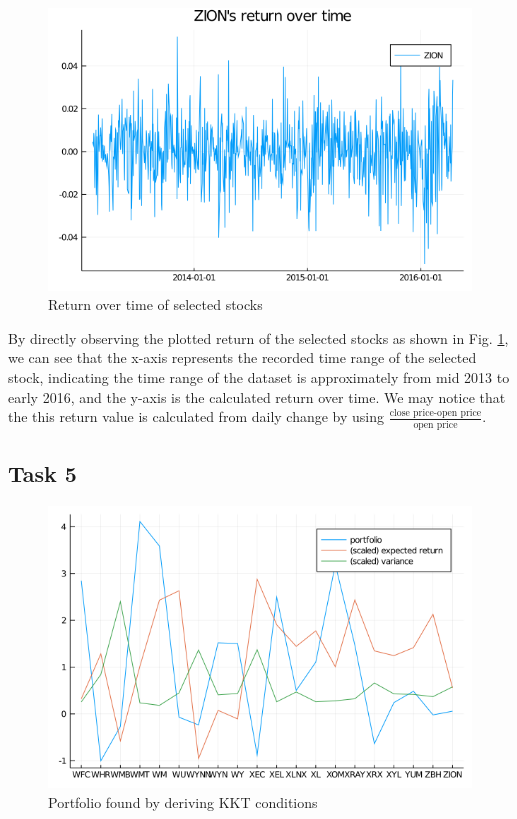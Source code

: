 \documentclass[12pt]{ftec2101}
\begin{document}
\begin{figure}[h]
\begin{minipage}{0.45\textwidth}
    \end{minipage}\hfill
    \begin{minipage}{0.45\textwidth}
        \centering
        \includegraphics[scale=0.3]{stock4.png}
    \end{minipage}
    \caption{Return over time of selected stocks}
    \label{fig:stock}
\end{figure}

By directly observing the plotted return of the selected stocks as shown in Fig. \ref{fig:stock}, we can see that the x-axis represents the recorded time range of the selected stock, indicating the time range of the dataset is approximately from mid 2013 to early 2016, and the y-axis is the calculated return over time. We may notice that the this return value is calculated from daily change by using $\frac{\text{close~price-open~price}}{\text{open~price}}$. 
\subsection{Task 5}
\begin{figure}[htbp]
    \centering
    \includegraphics[scale=0.55]{5-normal.png}
    \caption{Portfolio found by deriving KKT conditions}
    \label{fig:KKT}
\end{figure}
\end{document}
